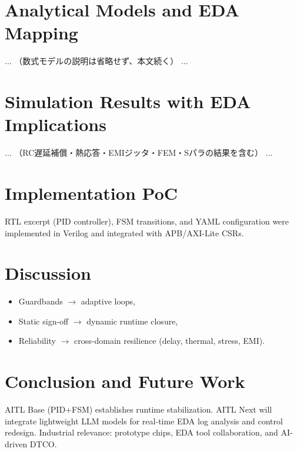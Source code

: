 \documentclass[conference]{IEEEtran}
\begin{document}
\begin{figure*}[t]
{%
  }
\end{figure*}

\section{Analytical Models and EDA Mapping}
... （数式モデルの説明は省略せず、本文続く） ...

\section{Simulation Results with EDA Implications}
... （RC遅延補償・熱応答・EMIジッタ・FEM・Sパラの結果を含む） ...

\section{Implementation PoC}
RTL excerpt (PID controller), FSM transitions, and YAML configuration were implemented in Verilog and integrated with APB/AXI-Lite CSRs.

\section{Discussion}
\begin{itemize}
  \item Guardbands $\to$ adaptive loops,
  \item Static sign-off $\to$ dynamic runtime closure,
  \item Reliability $\to$ cross-domain resilience (delay, thermal, stress, EMI).
\end{itemize}

\section{Conclusion and Future Work}
AITL Base (PID+FSM) establishes runtime stabilization.
AITL Next will integrate lightweight LLM models for real-time EDA log analysis and control redesign.
Industrial relevance: prototype chips, EDA tool collaboration, and AI-driven DTCO.
\end{document}

